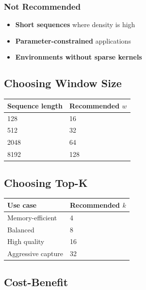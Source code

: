 \subsubsection{Not Recommended}

\begin{itemize}
\item \textbf{Short sequences} where density is high
\item \textbf{Parameter-constrained} applications
\item \textbf{Environments without sparse kernels}

\end{itemize}
\subsection{Choosing Window Size}

\begin{table}[H]
\centering
\small
\begin{tabular}{ll}
\toprule
\textbf{Sequence length} & \textbf{Recommended $w$} \\
\midrule
128 & 16 \\
512 & 32 \\
2048 & 64 \\
8192 & 128 \\
\bottomrule
\end{tabular}
\end{table}

\subsection{Choosing Top-K}

\begin{table}[H]
\centering
\small
\begin{tabular}{ll}
\toprule
\textbf{Use case} & \textbf{Recommended $k$} \\
\midrule
Memory-efficient & 4 \\
Balanced & 8 \\
High quality & 16 \\
Aggressive capture & 32 \\
\bottomrule
\end{tabular}
\end{table}

\subsection{Cost-Benefit}

